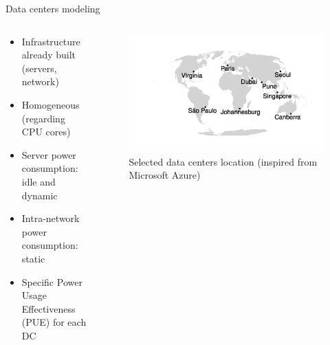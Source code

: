 \documentclass[Ligatures=TeX,table,svgnames,usetotalslideindicator,compress,10pt,aspectratio=169]{beamer}
\begin{document}
\begin{frame}{Data centers modeling}  

\begin{columns}
    \begin{column}{.5\textwidth}
        
  
  \begin{itemize}

  \item Infrastructure already built (servers, network)
  \item Homogeneous (regarding CPU cores)
  \item Server power consumption: idle and dynamic 
  \item Intra-network power consumption: static 
  \item Specific Power Usage Effectiveness (PUE) for each DC

  \end{itemize}
    \end{column}
    \begin{column}{.5\textwidth}
  \begin{figure}[!h]
    \centering
    \includegraphics[width=\textwidth]{images/locations_.pdf}
    \caption{Selected data centers location (inspired from Microsoft Azure)}
  \end{figure}       
    \end{column}
\end{columns}

  

   
\end{frame}
\end{document}
